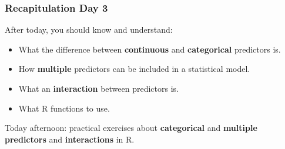 \documentclass{beamer}
\begin{document}
\begin{frame}
  \frametitle{Recapitulation Day 3}
  After today, you should know and understand:
  \begin{itemize}
    \item What the difference between \textbf{continuous} and \textbf{categorical} predictors is.
    \item How \textbf{multiple} predictors can be included in a statistical model.
    \item What an \textbf{interaction} between predictors is.
    \item What R functions to use.
  \end{itemize}
  
  \vspace{1cm}
  Today afternoon: practical exercises about \textbf{categorical} and \textbf{multiple predictors} and \textbf{interactions} in R.
\end{frame}
\end{document}
